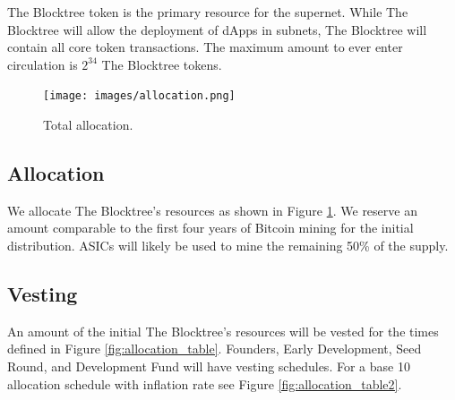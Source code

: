 \documentclass[12pt]{article}
\begin{document}
The Blocktree token is the primary resource for the supernet. While The Blocktree will allow the deployment of dApps in subnets, The Blocktree will contain all core token transactions. The maximum amount to ever enter circulation is $2^{34}$ The Blocktree tokens.

\begin{figure}[h!]
\centering
  \texttt{[image: images/allocation.png]}
  \caption{Total allocation.}
  \label{fig:allocation}
\end{figure}

\subsection{Allocation}

We allocate The Blocktree's resources as shown in Figure \ref{fig:allocation}. 
We reserve an amount comparable to the first four years of Bitcoin mining for the initial distribution.  ASICs will likely be used to mine the remaining 50\% of the supply.



\subsection{Vesting}

An amount of the initial The Blocktree's resources will be vested for the times defined in Figure \ref{fig:allocation_table}. Founders, Early Development, Seed Round, and Development Fund will have vesting schedules. For a base 10 allocation schedule with inflation rate see Figure \ref{fig:allocation_table2}.

\newpage
\end{document}

